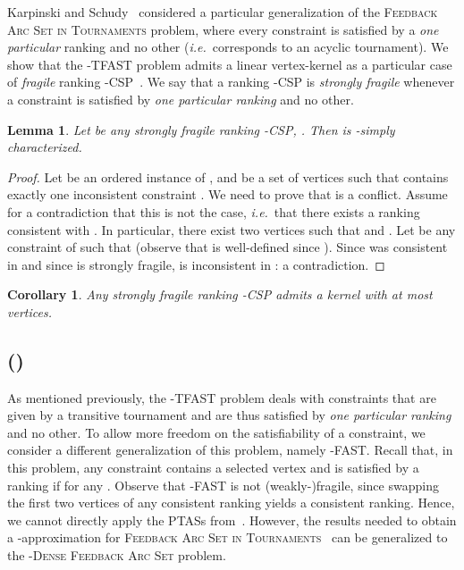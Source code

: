 \documentclass[11pt]{article}
\newtheorem{corollary}[theorem]{Corollary}
\newtheorem{lemma}[theorem]{Lemma}
\def\ie{{\em i.e.}~}
\newcommand{\FAST}{\textsc{Feedback Arc Set in Tournaments}}
\newcommand{\FASHT}{\textsc{-Dense Feedback Arc Set}}
\begin{document}
Karpinski and Schudy~\cite{KS10} considered a particular generalization of the \FAST{} problem, where every constraint  is satisfied by a \emph{one particular} ranking  and no other (\ie  corresponds to an acyclic tournament). 
We show that the {\sc -TFAST}  problem admits a linear vertex-kernel as a particular case of \emph{fragile} ranking -CSP~\cite{KS11}. We say that a ranking 
-CSP is \emph{strongly fragile} whenever a constraint is satisfied by \emph{one particular ranking} and no other. 

\begin{lemma}
\label{lem:lcrfast}
	Let  be any strongly fragile ranking -CSP, . Then  is -simply  
	characterized. 
\end{lemma}

\begin{proof}
	Let  be an ordered instance of , and  be a 
	set of  vertices such that  contains exactly one inconsistent constraint . We need to prove that  is a conflict. Assume for a contradiction 
	that this is not the case, \ie that there exists a ranking  consistent 
	with . In particular, there exist two vertices  such that 
	 and . Let  be any constraint of  
	such that  (observe that  is well-defined since ). 
	Since  was consistent in  and since  
	is strongly fragile,  is inconsistent in : a contradiction.
 \end{proof}

\begin{corollary}
	Any strongly fragile ranking -CSP admits a kernel with at most   
	vertices. 
\end{corollary}

\subsection{ ()}
\label{subsec:rfasht}

As mentioned previously, the {\sc -TFAST}  problem deals with constraints that are given by a transitive tournament and are thus satisfied by \emph{one particular ranking} and no other. To allow more freedom on the satisfiability of a constraint, we consider a different generalization of this problem, namely {\sc -FAST}. Recall that, in this problem, any constraint  contains a selected vertex  and is satisfied by a ranking  if  for any . Observe that {\sc -FAST} is not (weakly-)fragile, since swapping the first two vertices of any consistent ranking yields a consistent ranking. Hence, we cannot directly apply the PTASs from~\cite{KS11}. 
\noindent However, the results needed to obtain a -approximation for \textsc{Feedback Arc Set in Tournaments}~\cite{CFR06} can be generalized to the \FASHT{} problem.
\end{document}
